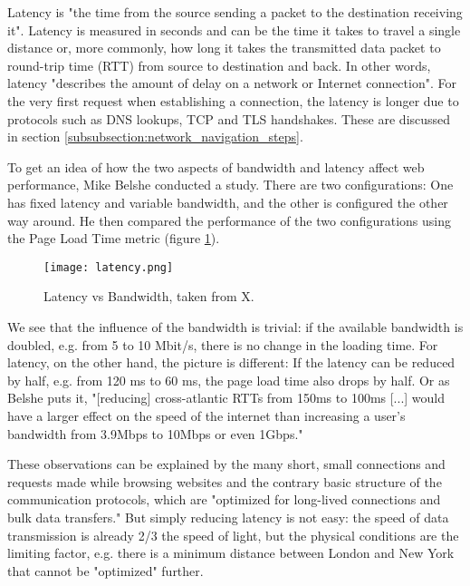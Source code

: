 
Latency is "the time from the source sending a packet to the destination receiving it".  %
Latency is measured in seconds and can be the time it takes to travel a single distance or, more commonly, how long it takes the transmitted data packet to round-trip time (RTT) from source to destination and back.
In other words, latency "describes the amount of delay on a network or Internet connection". %
For the very first request when establishing a connection, the latency is longer due to protocols such as DNS lookups, TCP and TLS handshakes.
These are discussed in section \ref{subsubsection:network_navigation_steps}. %



To get an idea of how the two aspects of bandwidth and latency affect web performance, Mike Belshe conducted a study. %
There are two configurations: One has fixed latency and variable bandwidth, and the other is configured the other way around.
He then compared the performance of the two configurations using the Page Load Time metric (figure \ref{img:latency}).


\begin{figure}[h!]
\begin{center}
\texttt{[image: latency.png]}
\caption{Latency vs Bandwidth, taken from X.} %
\label{img:latency}
\end{center}
\end{figure}


We see that the influence of the bandwidth is trivial: if the available bandwidth is doubled, e.g. from 5 to 10 Mbit/s, there is no change in the loading time.
For latency, on the other hand, the picture is different: If the latency can be reduced by half, e.g. from 120 ms to 60 ms, the page load time also drops by half.
Or as Belshe puts it, "[reducing] cross-atlantic RTTs from 150ms to 100ms [...] would have a larger effect on the speed of the internet than increasing a user's bandwidth from 3.9Mbps to 10Mbps or even 1Gbps." %

These observations can be explained by the many short, small connections and requests made while browsing websites and the contrary basic structure of the communication protocols, which are "optimized for long-lived connections and bulk data transfers." %
But simply reducing latency is not easy: the speed of data transmission is already 2/3 the speed of light, but the physical conditions are the limiting factor, e.g. there is a minimum distance between London and New York that cannot be "optimized" further. %


